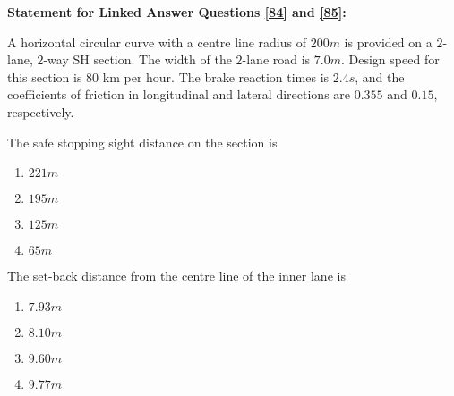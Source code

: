     \item[] \textbf{Statement for Linked Answer Questions \ref{84} and \ref{85}:}
    
    A horizontal circular curve with a centre line radius of $200 m$ is provided on a $2$-lane, $2$-way SH section. The width of the $2$-lane road is $7.0 m$. Design speed for this section is $80$ km per hour. The brake reaction times is $2.4 s$, and the coefficients of friction in longitudinal and lateral directions are $0.355$ and $0.15$, respectively.
    \item \label{84} The safe stopping sight distance on the section is 
        \begin{enumerate}
            \item $221m$
            \item $195m$
            \item $125m$
            \item $65m$
        \end{enumerate}

    \item \label{85} The set-back distance from the centre line of the inner lane is 
        \begin{enumerate}
            \item $7.93m$
            \item $8.10m$
            \item $9.60m$
            \item $9.77m$
        \end{enumerate}



